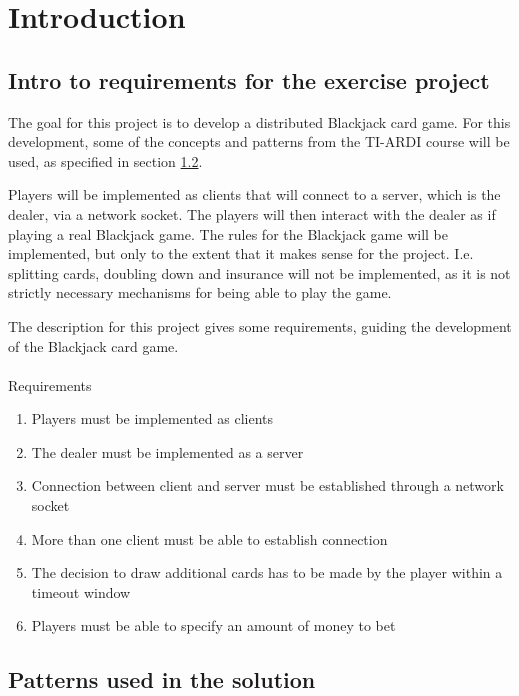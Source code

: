 \chapter{Introduction}
\label{chp:intro}

\section{Intro to requirements for the exercise project}

The goal for this project is to develop a distributed Blackjack card game. For this development, some of the concepts and patterns from the TI-ARDI course will be used, as specified in section \ref{chp:patterns}. 

Players will be implemented as clients that will connect to a server, which is the dealer, via a network socket. The players will then interact with the dealer as if playing a real Blackjack game. The rules for the Blackjack game will be implemented, but only to the extent that it makes sense for the project. I.e. splitting cards, doubling down and insurance will not be implemented, as it is not strictly necessary mechanisms for being able to play the game. 

The description for this project gives some requirements, guiding the development of the Blackjack card game.\\
\\
Requirements
\begin{enumerate}  
	\item Players must be implemented as clients
	\item The dealer must be implemented as a server
	\item Connection between client and server must be established through a network socket
	\item More than one client must be able to establish connection
	\item The decision to draw additional cards has to be made by the player within a timeout window
	\item Players must be able to specify an amount of money to bet
\end{enumerate}

\section{Patterns used in the solution}
\label{chp:patterns}
